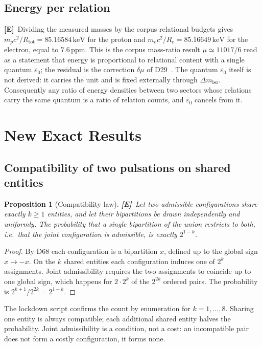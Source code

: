 \documentclass[11pt,a4paper]{article}
\theoremstyle{plain}
\newtheorem{proposition}[theorem]{Proposition}
\theoremstyle{definition}
\theoremstyle{remark}
\newcommand{\statE}{\textbf{[E]}}
\begin{document}
\subsection{Energy per relation}

\statE\ Dividing the measured masses by the corpus relational budgets gives $m_pc^2/R_{\mathrm{tot}}=85.16584\,\mathrm{keV}$ for the proton and $m_ec^2/R_e=85.16649\,\mathrm{keV}$ for the electron, equal to $7.6\,\mathrm{ppm}$. This is the corpus mass-ratio result $\mu\simeq11017/6$ read as a statement that energy is proportional to relational content with a single quantum $\varepsilon_0$; the residual is the correction $\delta\mu$ of D29~\citep{D29}. The quantum $\varepsilon_0$ itself is not derived: it carries the unit and is fixed externally through $\Delta m_{\mathrm{iso}}$. Consequently any ratio of energy densities between two sectors whose relations carry the same quantum is a ratio of relation counts, and $\varepsilon_0$ cancels from it.

\section{New Exact Results}
\label{sec:exact}

\subsection{Compatibility of two pulsations on shared entities}

\begin{proposition}[Compatibility law]\label{prop:compat}
\statE\ Let two admissible configurations share exactly $k\ge1$ entities, and let their bipartitions be drawn independently and uniformly. The probability that a single bipartition of the union restricts to both, i.e.\ that the joint configuration is admissible, is exactly $2^{1-k}$.
\end{proposition}

\begin{proof}
By D68 each configuration is a bipartition $x$, defined up to the global sign $x\to-x$. On the $k$ shared entities each configuration induces one of $2^k$ assignments. Joint admissibility requires the two assignments to coincide up to one global sign, which happens for $2\cdot2^k$ of the $2^{2k}$ ordered pairs. The probability is $2^{k+1}/2^{2k}=2^{1-k}$.
\end{proof}

The lockdown script confirms the count by enumeration for $k=1,\dots,8$. Sharing one entity is always compatible; each additional shared entity halves the probability. Joint admissibility is a condition, not a cost: an incompatible pair does not form a costly configuration, it forms none.
\end{document}
